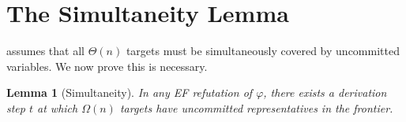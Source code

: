 \documentclass[11pt]{article}
\newtheorem{lemma}[theorem]{Lemma}
\theoremstyle{definition}
\begin{document}
\section{The Simultaneity Lemma}\label{sec:simultaneous}

 assumes that all $\Theta(n)$ targets must be
simultaneously covered by uncommitted variables.  We now prove this
is necessary.

\begin{lemma}[Simultaneity]\label{lem:simultaneous}
In any EF refutation of $\varphi$, there exists a derivation step $t$
at which $\Omega(n)$ targets have uncommitted representatives in the
frontier.
\end{lemma}
\end{document}
